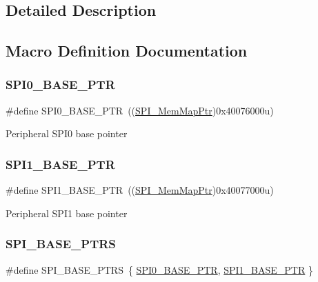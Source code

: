 \subsection{Detailed Description}


\subsection{Macro Definition Documentation}
\mbox{\label{group___s_p_i___peripheral_ga851f64a97b5919c1f99a34db5918b3b4}} 
\subsubsection{\texorpdfstring{S\+P\+I0\+\_\+\+B\+A\+S\+E\+\_\+\+P\+TR}{SPI0\_BASE\_PTR}}
{\footnotesize\ttfamily \#define S\+P\+I0\+\_\+\+B\+A\+S\+E\+\_\+\+P\+TR~((\hyperlink{group___s_p_i___peripheral_ga7e4e9921e4d56bdbb10a04e77743ff5e}{S\+P\+I\+\_\+\+Mem\+Map\+Ptr})0x40076000u)}

Peripheral S\+P\+I0 base pointer \mbox{\label{group___s_p_i___peripheral_gae28fd789e0602a32076c1c13ca39f5af}} 
\subsubsection{\texorpdfstring{S\+P\+I1\+\_\+\+B\+A\+S\+E\+\_\+\+P\+TR}{SPI1\_BASE\_PTR}}
{\footnotesize\ttfamily \#define S\+P\+I1\+\_\+\+B\+A\+S\+E\+\_\+\+P\+TR~((\hyperlink{group___s_p_i___peripheral_ga7e4e9921e4d56bdbb10a04e77743ff5e}{S\+P\+I\+\_\+\+Mem\+Map\+Ptr})0x40077000u)}

Peripheral S\+P\+I1 base pointer \mbox{\label{group___s_p_i___peripheral_ga3a16fecfe27c2052ab60e014be3f66f6}} 
\subsubsection{\texorpdfstring{S\+P\+I\+\_\+\+B\+A\+S\+E\+\_\+\+P\+T\+RS}{SPI\_BASE\_PTRS}}
{\footnotesize\ttfamily \#define S\+P\+I\+\_\+\+B\+A\+S\+E\+\_\+\+P\+T\+RS~\{ \hyperlink{group___s_p_i___peripheral_ga851f64a97b5919c1f99a34db5918b3b4}{S\+P\+I0\+\_\+\+B\+A\+S\+E\+\_\+\+P\+TR}, \hyperlink{group___s_p_i___peripheral_gae28fd789e0602a32076c1c13ca39f5af}{S\+P\+I1\+\_\+\+B\+A\+S\+E\+\_\+\+P\+TR} \}}

